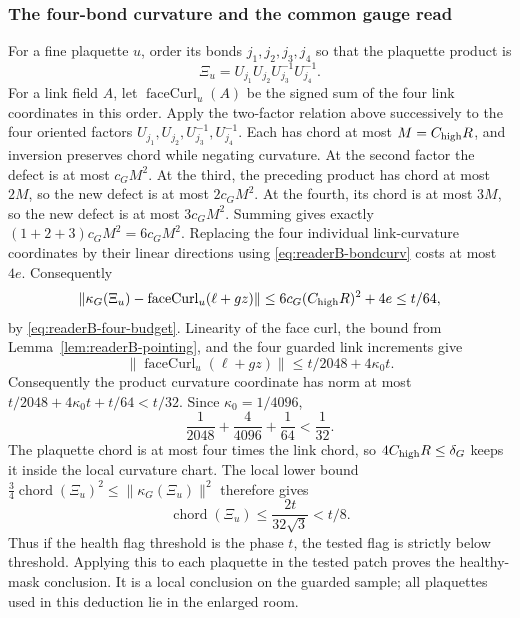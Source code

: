 \subsubsection{The four-bond curvature and the common gauge read}

For a fine plaquette $u$, order its bonds $j_1,j_2,j_3,j_4$ so that the
plaquette product is
\[
 \Xi_u=U_{j_1}U_{j_2}U_{j_3}^{-1}U_{j_4}^{-1}.
\]
For a link field $A$, let $\operatorname{faceCurl}_u(A)$ be the signed
sum of the four link coordinates in this order.
Apply the two-factor relation above successively to the four oriented
factors $U_{j_1},U_{j_2},U_{j_3}^{-1},U_{j_4}^{-1}$. Each has chord at most
$M=C_{\rm high}R$, and inversion preserves chord while negating curvature.
At the second factor the defect is at most $c_GM^2$. At the third, the
preceding product has chord at most $2M$, so the new defect is at most
$2c_GM^2$. At the fourth, its chord is at most $3M$, so the new defect is
at most $3c_GM^2$. Summing gives exactly
$(1+2+3)c_GM^2=6c_GM^2$. Replacing the four
individual link-curvature coordinates by their linear directions using
\eqref{eq:readerB-bondcurv} costs at most $4e$. Consequently
\begin{equation}\label{eq:readerB-four-product}
 \|\kappa_G(\Xi_u)-\operatorname{faceCurl}_u(\ell+gz)\|
       \leq 6c_G(C_{\rm high}R)^2+4e\leq t/64,
\end{equation}
by \eqref{eq:readerB-four-budget}. Linearity of the face curl, the bound
from Lemma~\ref{lem:readerB-pointing}, and the four guarded link increments
give
\[
 \|\operatorname{faceCurl}_u(\ell+gz)\|
       \leq t/2048+4\kappa_0t.
\]
Consequently the product curvature coordinate has norm at most
$t/2048+4\kappa_0t+t/64<t/32$.
Since $\kappa_0=1/4096$,
\[
 \frac1{2048}+\frac4{4096}+\frac1{64}<\frac1{32}.
\]
The plaquette chord is at most four times the link chord, so
$4C_{\rm high}R\leq\delta_G$ keeps it inside the local curvature chart.
The local lower bound $\tfrac34\operatorname{chord}(\Xi_u)^2
\le\|\kappa_G(\Xi_u)\|^2$ therefore gives
\begin{equation}\label{eq:readerB-healthy-face}
 \operatorname{chord}(\Xi_u)\le\frac{2t}{32\sqrt3}<t/8.
\end{equation}
Thus if the health flag threshold is the phase $t$, the tested flag is
strictly below threshold. Applying this to each plaquette in the tested
patch proves the healthy-mask conclusion. It is a local conclusion on the
guarded sample; all plaquettes used in this deduction lie in the enlarged room.

